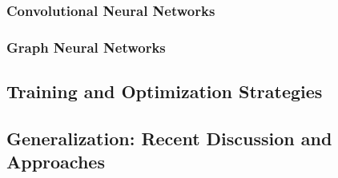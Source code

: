         \subsubsection{Convolutional Neural Networks}
        \subsubsection{Graph Neural Networks}

    \subsection{Training and Optimization Strategies} %

    \subsection{Generalization: Recent Discussion and Approaches} %
